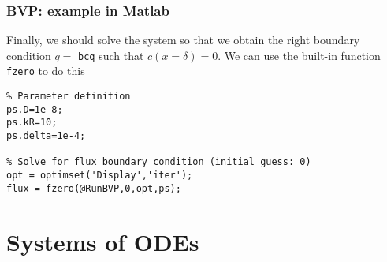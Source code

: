 \documentclass[11pt,table,final,fleqn,xcolor={usenames,dvipsnames,table}]{beamer}
\begin{document}
\begin{frame}[fragile]
  \frametitle{BVP: example in Matlab}
  Finally, we should solve the system so that we obtain the right boundary condition $q=$ \lstinline$bcq$ such that $c(x=\delta)=0$. We can use the built-in function \lstinline$fzero$ to do this
  \begin{lstlisting}
% Parameter definition
ps.D=1e-8;
ps.kR=10;
ps.delta=1e-4;

% Solve for flux boundary condition (initial guess: 0)
opt = optimset('Display','iter');
flux = fzero(@RunBVP,0,opt,ps);
  \end{lstlisting}
\end{frame}


\section{Systems of ODEs}
\end{document}
